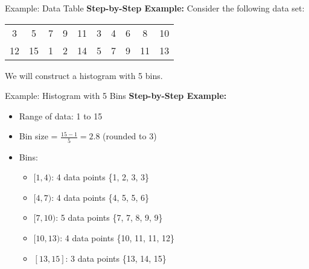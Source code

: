 \documentclass[handout]{beamer} %
\begin{document}
\begin{frame}{Example: Data Table}
    \textbf{Step-by-Step Example:}
    \vspace{0.5cm}
    Consider the following data set:

    \begin{center}
        \begin{tabular}{cccccccccc}
            3 & 5 & 7 & 9 & 11 & 3 & 4 & 6 & 8 & 10 \\
            12 & 15 & 1 & 2 & 14 & 5 & 7 & 9 & 11 & 13 \\
        \end{tabular}
    \end{center}

    \vspace{0.5cm}
    We will construct a histogram with 5 bins.
\end{frame}

\begin{frame}{Example: Histogram with 5 Bins }
    \textbf{Step-by-Step Example:}
    \begin{itemize}
        \item Range of data: 1 to 15
        \item Bin size = \( \frac{15 - 1}{5} = 2.8 \) (rounded to 3)
        \item Bins:
        \begin{itemize}
            \item \([1, 4)\): 4 data points \{1, 2, 3, 3\}
            \item \([4, 7)\): 4 data points \{4, 5, 5, 6\}
            \item \([7, 10)\): 5 data points \{7, 7, 8, 9, 9\}
            \item \([10, 13)\): 4 data points \{10, 11, 11, 12\}
            \item \([13, 15]\): 3 data points \{13, 14, 15\}
        \end{itemize}
    \end{itemize}


\end{frame}
\end{document}
